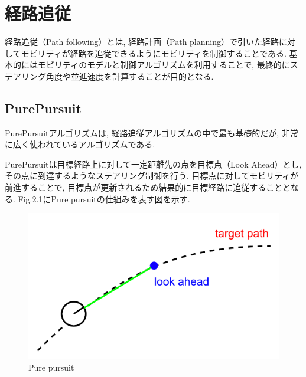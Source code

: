 

\section{経路追従}
経路追従（Path following）とは, 経路計画（Path planning）で引いた経路に対してモビリティが経路を追従できるようにモビリティを制御することである.
基本的にはモビリティのモデルと制御アルゴリズムを利用することで, 最終的にステアリング角度や並進速度を計算することが目的となる.

\subsection{PurePursuit}
PurePursuitアルゴリズムは, 経路追従アルゴリズムの中で最も基礎的だが, 非常に広く使われているアルゴリズムである.

PurePursuitは目標経路上に対して一定距離先の点を目標点（Look Ahead）とし, その点に到達するようなステアリング制御を行う.
目標点に対してモビリティが前進することで, 目標点が更新されるため結果的に目標経路に追従することとなる.
Fig.2.1にPure pursuitの仕組みを表す図を示す.

\begin{figure}[H]
     \centering
    \includegraphics[keepaspectratio, scale=0.5]
         {images/purepursuit.png}
    \caption{Pure pursuit}
    \label{fig:purepursuit}
\end{figure}

